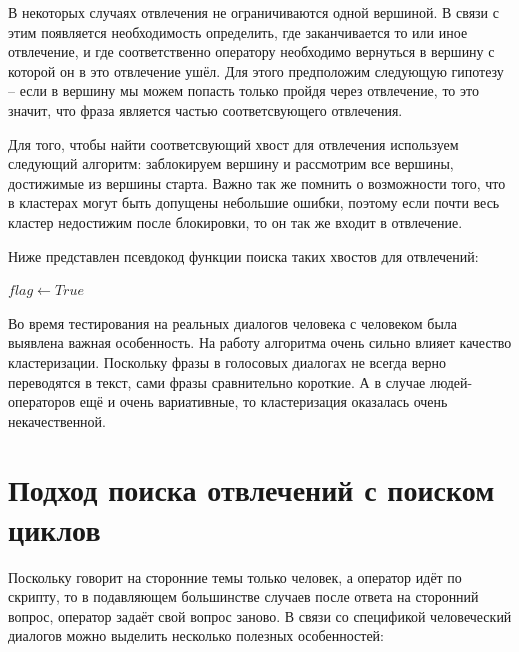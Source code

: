 \documentclass[specification,annotation]{itmo-student-thesis}
\begin{document}
	В некоторых случаях отвлечения не ограничиваются одной вершиной. В связи с этим появляется необходимость определить, где заканчивается то или иное отвлечение, и где соответственно оператору необходимо вернуться в вершину с которой он в это отвлечение ушёл. Для этого предположим следующую гипотезу -- если в вершину мы можем попасть только пройдя через отвлечение, то это значит, что фраза является частью соответсвующего отвлечения. 
	
	Для того, чтобы найти соответсвующий хвост для отвлечения используем следующий алгоритм: заблокируем вершину и рассмотрим все вершины, достижимые из вершины старта. Важно так же помнить о возможности того, что в кластерах могут быть допущены небольшие ошибки, поэтому если почти весь кластер недостижим после блокировки, то он так же входит в отвлечение.
	
	Ниже представлен псевдокод функции поиска таких хвостов для отвлечений:
	
	\begin{algorithmic}
		\State $flag\gets True$
		\Else
		\EndIf
		\EndFor
	\EndFor
		\Else
			\EndIf
		\EndIf
	\EndFor
	\EndFunction
\end{algorithmic}	
	
	Во время тестирования на реальных диалогов человека с человеком была выявлена важная особенность. На работу алгоритма очень сильно влияет качество кластеризации. Поскольку фразы в голосовых диалогах не всегда верно переводятся в текст, сами фразы сравнительно короткие. А в случае людей-операторов ещё и очень вариативные, то кластеризация оказалась очень некачественной.
	
	\section{Подход поиска отвлечений с поиском циклов}
	Поскольку говорит на сторонние темы только человек, а оператор идёт по скрипту, то в подавляющем большинстве случаев после ответа на сторонний вопрос, оператор задаёт свой вопрос заново. В связи со спецификой человеческий диалогов можно выделить несколько полезных особенностей:
	
\end{document}
